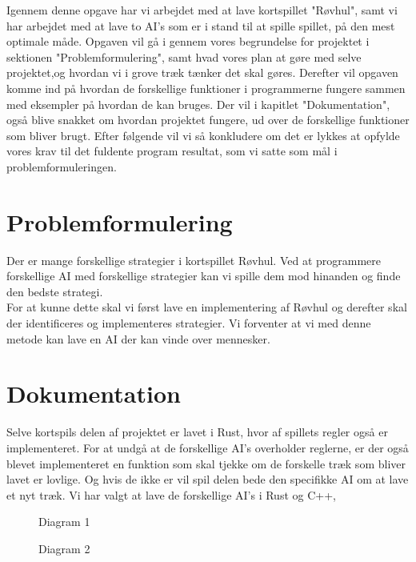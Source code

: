 \documentclass[a4paper, 12pt]{article}
\begin{document}
Igennem denne opgave har vi arbejdet med at lave kortspillet "Røvhul", samt vi har arbejdet med at lave to AI's som er i stand til at spille spillet, på den mest optimale måde. Opgaven vil gå i gennem vores begrundelse for projektet i sektionen "Problemformulering", samt hvad vores plan at gøre med selve projektet,og hvordan vi i grove træk tænker det skal gøres.
\bigbreak
Derefter vil opgaven komme ind på hvordan de forskellige funktioner i programmerne fungere sammen med eksempler på hvordan de kan bruges. Der vil i kapitlet "Dokumentation", også blive snakket om hvordan projektet fungere, ud over de forskellige funktioner som bliver brugt. Efter følgende vil vi så konkludere om det er lykkes at opfylde vores krav til det fuldente program resultat, som vi satte som mål i problemformuleringen.

\section{Problemformulering}

Der er mange forskellige strategier i kortspillet Røvhul. Ved at programmere forskellige AI med forskellige strategier kan vi spille dem mod hinanden og finde den bedste strategi.
\\
For at kunne dette skal vi først lave en implementering af Røvhul og derefter skal der identificeres og implementeres strategier. Vi forventer at vi med denne metode kan lave en AI der kan vinde over mennesker.

\vfill
\pagebreak

\section{Dokumentation}
Selve kortspils delen af projektet er lavet i Rust, hvor af spillets regler også er implementeret. For at undgå at de forskellige AI's overholder reglerne, er der også blevet implementeret en funktion som skal tjekke om de forskelle træk som bliver lavet er lovlige. Og hvis de ikke er vil spil delen bede den specifikke AI om at lave et nyt træk.
Vi har valgt at lave de forskellige AI's i Rust og C++, 

\begin{figure}[H]
	\centering
	
	\caption{Diagram 1}
\end{figure}

\begin{figure}[H]
	\centering
	
	\caption{Diagram 2}
\end{figure}
\end{document}
